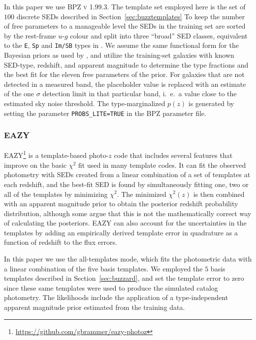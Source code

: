In this paper we use \textsc{BPZ v 1.99.3}. The template set employed here is the set of $100$ discrete SEDs described in Section~\ref{sec:buzztemplates}
To keep the number of free parameters to a manageable level the SEDs in the training set are sorted by the rest-frame $u$-$g$ colour and split into three ``broad'' SED classes, equivalent to the \texttt{E}, \texttt{Sp} and \texttt{Im/SB} types in \citet{Benitez:00}. We assume the same functional form for the Bayesian priors as used by \citet{Benitez:00}, and utilize the training-set galaxies with known SED-type, redshift, and apparent magnitude to determine the type fractions and the best fit for the eleven free parameters of the prior.
For galaxies that are not detected in a measured band, the placeholder value is replaced with an estimate of the one $\sigma$ detection limit in that particular band, i.~e.~a value close to the estimated sky noise threshold.
The type-marginalized $p(z)$ is generated by setting the parameter \texttt{PROBS\_LITE=TRUE} in the \textsc{BPZ} parameter file.

\subsubsection{EAZY} \label{sec:eazy}

\textsc{EAZY}\footnote{\url{https://github.com/gbrammer/eazy-photoz}} \citep[Easy and Accurate Photometric Redshifts from Yale,][]{Brammer:08} is a template-based photo-$z$ code that includes several features that improve on the basic $\chi^2$ fit used in many template codes. It can fit the observed photometry with SEDs created from a linear combination of a set of templates at each redshift, and the best-fit SED is found by simultaneously fitting one, two or all of the templates by minimizing $\chi^2$. The minimized $\chi^2(z)$ is then combined with an apparent magnitude prior to obtain the posterior redshift probability distribution, although some argue that this is not the mathematically correct way of calculating the posteriors. \textsc{EAZY} can also account for the uncertainties in the templates by adding an empirically derived template error in quadrature as a function of redshift to the flux errors.

In this paper we use the all-templates mode, which fits the photometric data with a linear combination of the five basis templates. We employed the $5$ basis templates described in Section~\ref{sec:buzzard}, and set the template error to zero since these same templates were used to produce the simulated catalog photometry. %
The likelihoods include the application of a type-independent apparent magnitude prior estimated from the training data.

